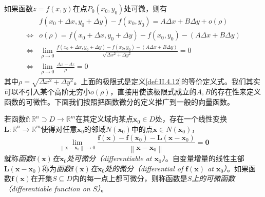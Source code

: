 \documentclass[../main.tex]{subfiles}
\begin{document}
如果函数$z=f\left(x,y\right)$在点$P_0\left(x_0,y_0\right)$处可微，则有
\begin{align*}
                    & f\left(x_0+\Delta x,y_0+\Delta y\right)-f\left(x_0,y_0\right)=A\Delta x+B\Delta y+o\left(\rho\right)                                                 \\
    \Leftrightarrow & o\left(\rho\right)=f\left(x_0+\Delta x,y_0+\Delta y\right)-f\left(x_0,y_0\right)-\left(A\Delta x+B\Delta y\right)                                    \\
    \Leftrightarrow & \lim_{\rho\to0}\frac{f\left(x_0+\Delta x,y_0+\Delta y\right)-f\left(x_0,y_0\right)-\left(A\Delta x+B\Delta y\right)}{\sqrt{\Delta x^2+\Delta y^2}}=0 \\
    \Leftrightarrow & \lim_{\rho\to0}\frac{\Delta z-dz}{\rho}=0
\end{align*}
其中$\rho=\sqrt{\Delta x^2+\Delta y^2}$。上面的极限式是定义\ref{def:II.4.12}的等价定义式。我们其实可以不引入某个高阶无穷小$o\left(\rho\right)$，直接用使该极限式成立的$A,B$的存在性来定义函数的可微性。下面我们按照把函数微分的定义推广到一般的向量函数。

\begin{definition}[向量值函数的微分]\label{def:II.4.13}
    若函数$\mathbf{f}:\mathbb{R}^n\supset D\rightarrow\mathbb{R}^m$在其定义域内某点$\mathbf{x}_0\in D$处，存在一个线性变换$\mathbf{L}:\mathbb{R}^n\rightarrow\mathbb{R}^m$使得对任意$\mathbf{x}_0$的邻域$N\left(\mathbf{x}_0\right)$中的点$\mathbf{x}\in N\left(\mathbf{x}_0\right)$，
    \[\lim_{\left\|\mathbf{x}-\mathbf{x}_0\right\|\to 0}\frac{\mathbf{f}\left(\mathbf{x}\right)-\mathbf{f}\left(\mathbf{x}_0\right)-\mathbf{L}\left(\mathbf{x}-\mathbf{x}_0\right)}{\left\|\mathbf{x}-\mathbf{x}_0\right\|}=\mathbf{0}\]
    就称\emph{函数$\mathbf{f}\left(\mathbf{x}\right)$在$\mathbf{x}_0$处可微分（differentiable at $\mathbf{x}_0$）}。自变量增量的线性主部$\mathbf{L}\left(\mathbf{x}-\mathbf{x}_0\right)$称为\emph{函数$\mathbf{f}\left(\mathbf{x}\right)$在$\mathbf{x}_0$处的微分（differential of $\mathbf{f}\left(\mathbf{x}\right)$ at $\mathbf{x}_0$）}。如果函数$\mathbf{f}\left(\mathbf{x}\right)$在开集$S\subseteq D$内的每一点上都可微分，则称函数是\emph{$S$上的可微函数（differentiable function on $S$）}。
\end{definition}
\end{document}
